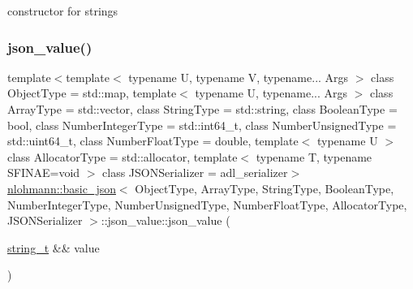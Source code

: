 constructor for strings 

\mbox{\label{unionnlohmann_1_1basic__json_1_1json__value_ab9c8696a9477ec8a9bce79dec04ef418}} 
\subsubsection{\texorpdfstring{json\_value()}{json\_value()}\hspace{0.1cm}{\footnotesize\ttfamily [8/12]}}
{\footnotesize\ttfamily template$<$template$<$ typename U, typename V, typename... Args $>$ class Object\+Type = std\+::map, template$<$ typename U, typename... Args $>$ class Array\+Type = std\+::vector, class String\+Type  = std\+::string, class Boolean\+Type  = bool, class Number\+Integer\+Type  = std\+::int64\+\_\+t, class Number\+Unsigned\+Type  = std\+::uint64\+\_\+t, class Number\+Float\+Type  = double, template$<$ typename U $>$ class Allocator\+Type = std\+::allocator, template$<$ typename T, typename S\+F\+I\+N\+A\+E=void $>$ class J\+S\+O\+N\+Serializer = adl\+\_\+serializer$>$ \\
\mbox{\hyperlink{classnlohmann_1_1basic__json}{nlohmann\+::basic\+\_\+json}}$<$ Object\+Type, Array\+Type, String\+Type, Boolean\+Type, Number\+Integer\+Type, Number\+Unsigned\+Type, Number\+Float\+Type, Allocator\+Type, J\+S\+O\+N\+Serializer $>$\+::json\+\_\+value\+::json\+\_\+value (\begin{DoxyParamCaption}\item[{\mbox{\hyperlink{classnlohmann_1_1basic__json_a61f8566a1a85a424c7266fb531dca005}{string\+\_\+t}} \&\&}]{value }\end{DoxyParamCaption})\hspace{0.3cm}{\ttfamily [inline]}}



